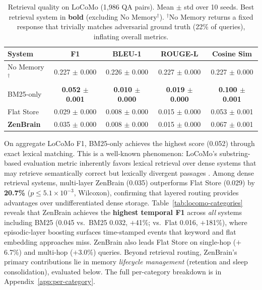 \documentclass{article}
\begin{document}
\begin{table}[h]
    \caption{Retrieval quality on LoCoMo (1{,}986 QA pairs). Mean $\pm$ std over 10 seeds.
    Best retrieval system in \textbf{bold} (excluding No Memory$^\dagger$).
    $^\dagger$No Memory returns a fixed response that trivially matches
    adversarial ground truth (22\% of queries), inflating overall metrics.}
    \label{tab:locomo}
    \centering
    \begin{tabular}{lcccc}
        \toprule
        System & F1 & BLEU-1 & ROUGE-L & Cosine Sim \\
        \midrule
        No Memory$^\dagger$ & 0.227 $\pm$ 0.000 & 0.226 $\pm$ 0.000 & 0.227 $\pm$ 0.000 & 0.227 $\pm$ 0.000 \\
        BM25-only & \textbf{0.052 $\pm$ 0.001} & \textbf{0.010 $\pm$ 0.000} & \textbf{0.019 $\pm$ 0.000} & \textbf{0.100 $\pm$ 0.001} \\
        Flat Store & 0.029 $\pm$ 0.000 & 0.008 $\pm$ 0.000 & 0.015 $\pm$ 0.000 & 0.053 $\pm$ 0.001 \\
        \textbf{ZenBrain} & 0.035 $\pm$ 0.000 & 0.008 $\pm$ 0.000 & 0.015 $\pm$ 0.000 & 0.067 $\pm$ 0.001 \\
        \bottomrule
    \end{tabular}
\end{table}

On aggregate LoCoMo F1, BM25-only achieves the highest score (0.052)
through exact lexical matching.  This is a well-known phenomenon:
LoCoMo's substring-based evaluation metric inherently favors lexical
retrieval over dense systems that may retrieve semantically correct but
lexically divergent passages \citep{maharana2024locomo}.
Among dense retrieval systems, multi-layer ZenBrain (0.035)
outperforms Flat Store (0.029) by \textbf{20.7\%} ($p \le 5.1\times 10^{-3}$, Wilcoxon),
confirming that layered routing provides advantages over undifferentiated
dense storage.
Table~\ref{tab:locomo-categories} reveals that ZenBrain achieves the
\textbf{highest temporal F1} across \emph{all} systems including BM25
(0.045 vs.\ BM25 0.032, $+$41\%; vs.\ Flat 0.016, $+$181\%),
where episodic-layer boosting surfaces time-stamped events that keyword
and flat embedding approaches miss.
ZenBrain also leads Flat Store on single-hop ($+$6.7\%) and multi-hop
($+$3.0\%) queries.
Beyond retrieval routing, ZenBrain's primary contributions lie in
memory \emph{lifecycle management} (retention and sleep consolidation),
evaluated below.
The full per-category breakdown is in Appendix~\ref{app:per-category}.
\end{document}
